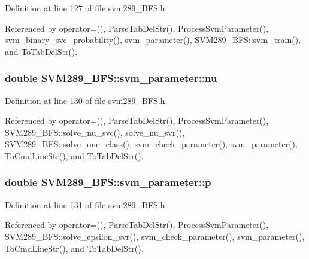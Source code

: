 Definition at line 127 of file svm289\+\_\+\+B\+F\+S.\+h.



Referenced by operator=(), Parse\+Tab\+Del\+Str(), Process\+Svm\+Parameter(), svm\+\_\+binary\+\_\+svc\+\_\+probability(), svm\+\_\+parameter(), S\+V\+M289\+\_\+\+B\+F\+S\+::svm\+\_\+train(), and To\+Tab\+Del\+Str().

\subsubsection[{\texorpdfstring{nu}{nu}}]{\setlength{\rightskip}{0pt plus 5cm}double S\+V\+M289\+\_\+\+B\+F\+S\+::svm\+\_\+parameter\+::nu}\hypertarget{struct_s_v_m289___b_f_s_1_1svm__parameter_a6f25339a407582eca1800e6561b24ebc}{}\label{struct_s_v_m289___b_f_s_1_1svm__parameter_a6f25339a407582eca1800e6561b24ebc}


Definition at line 130 of file svm289\+\_\+\+B\+F\+S.\+h.



Referenced by operator=(), Parse\+Tab\+Del\+Str(), Process\+Svm\+Parameter(), S\+V\+M289\+\_\+\+B\+F\+S\+::solve\+\_\+nu\+\_\+svc(), solve\+\_\+nu\+\_\+svr(), S\+V\+M289\+\_\+\+B\+F\+S\+::solve\+\_\+one\+\_\+class(), svm\+\_\+check\+\_\+parameter(), svm\+\_\+parameter(), To\+Cmd\+Line\+Str(), and To\+Tab\+Del\+Str().

\subsubsection[{\texorpdfstring{p}{p}}]{\setlength{\rightskip}{0pt plus 5cm}double S\+V\+M289\+\_\+\+B\+F\+S\+::svm\+\_\+parameter\+::p}\hypertarget{struct_s_v_m289___b_f_s_1_1svm__parameter_ae511b0f9f6d30b4f3d5348890b915e08}{}\label{struct_s_v_m289___b_f_s_1_1svm__parameter_ae511b0f9f6d30b4f3d5348890b915e08}


Definition at line 131 of file svm289\+\_\+\+B\+F\+S.\+h.



Referenced by operator=(), Parse\+Tab\+Del\+Str(), Process\+Svm\+Parameter(), S\+V\+M289\+\_\+\+B\+F\+S\+::solve\+\_\+epsilon\+\_\+svr(), svm\+\_\+check\+\_\+parameter(), svm\+\_\+parameter(), To\+Cmd\+Line\+Str(), and To\+Tab\+Del\+Str().

